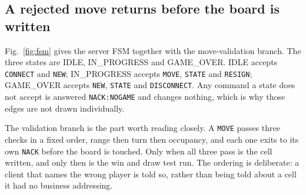 \subsection{A rejected move returns before the board is written}
Fig.~\ref{fig:fsm} gives the server FSM together with the move-validation
branch. The three states are IDLE, IN\_PROGRESS and GAME\_OVER. IDLE accepts
\texttt{CONNECT} and \texttt{NEW}; IN\_PROGRESS accepts \texttt{MOVE},
\texttt{STATE} and \texttt{RESIGN}; GAME\_OVER accepts \texttt{NEW},
\texttt{STATE} and \texttt{DISCONNECT}. Any command a state does not accept is
answered \texttt{NACK:NOGAME} and changes nothing, which is why those edges are
not drawn individually.

The validation branch is the part worth reading closely. A \texttt{MOVE} passes
three checks in a fixed order, range then turn then occupancy, and each one
exits to its own \texttt{NACK} before the board is touched. Only when all three
pass is the cell written, and only then is the win and draw test run. The
ordering is deliberate: a client that names the wrong player is told so, rather
than being told about a cell it had no business addressing.

